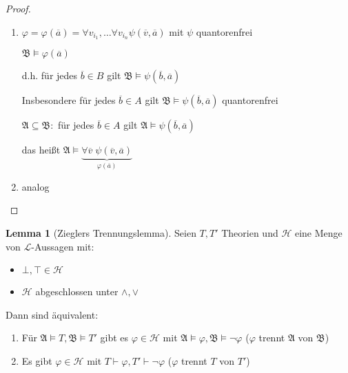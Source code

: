 \documentclass[12pt,parskip=full]{scrartcl}
\theoremstyle{definition}
\newtheorem{lemma}[theorem]{Lemma}
\begin{document}
	\begin{proof}
		\begin{enumerate}
			\item $\varphi = \varphi(\overline{a}) = \forall v_{i_1}, \dots \forall v_{i_n} \psi(\overline{v}, \overline{a})$ mit $\psi$ quantorenfrei
			
			$\mathfrak{B} \models \varphi(\overline{a})$
			
			d.h. für jedes $\overline{b} \in B$ gilt $\mathfrak{B} \models \psi(\overline{b}, \overline{a})$
			
			Insbesondere für jedes $\overline{b} \in A$ gilt $\mathfrak{B} \models \psi(\overline{b}, \overline{a})$ quantorenfrei
			
			$\mathfrak{A} \subseteq \mathfrak{B}:$ für jedes $\overline{b} \in A$ gilt $\mathfrak{A} \models \psi(\overline{b}, \overline{a})$
			
			das heißt $\mathfrak{A} \models \underbrace{\forall \overline{v} \; \psi(\overline{v}, \overline{a})}_{\varphi(\overline{a})}$
			
			\item analog
		\end{enumerate}
	\end{proof}

	\begin{lemma}[Zieglers Trennungslemma]
		Seien $T, T'$ Theorien und $\mathcal{H}$ eine Menge von $\mathcal{L}$-Aussagen mit:
		\begin{itemize}
			\item $\bot, \top \in \mathcal{H}$
			\item $\mathcal{H}$ abgeschlossen unter $\land, \lor$
		\end{itemize}
	
		Dann sind äquivalent:
		\begin{enumerate}
			\item Für $\mathfrak{A} \models T, \mathfrak{B} \models T'$ gibt es $\varphi \in \mathcal{H}$ mit $\mathfrak{A} \models \varphi, \mathfrak{B} \models \lnot \varphi$ ($\varphi$ trennt $\mathfrak{A}$ von $\mathfrak{B}$)
			\item Es gibt $\varphi \in \mathcal{H}$ mit $T \vdash \varphi, T' \vdash \lnot \varphi$  ($\varphi$ trennt $T$ von $T'$)
		\end{enumerate}
	\end{lemma}
\end{document}
